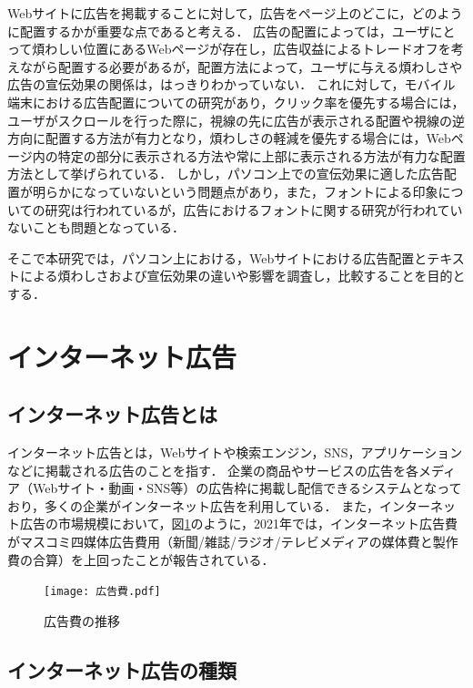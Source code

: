 \documentclass[12pt,a4j,titlepage]{ltjsarticle}
\begin{document}
Webサイトに広告を掲載することに対して，広告をページ上のどこに，どのように配置するかが重要な点であると考える．
広告の配置によっては，ユーザにとって煩わしい位置にあるWebページが存在し，広告収益によるトレードオフを考えながら配置する必要があるが，配置方法によって，ユーザに与える煩わしさや広告の宣伝効果の関係は，はっきりわかっていない．
これに対して，モバイル端末における広告配置についての研究があり，クリック率を優先する場合には，ユーザがスクロールを行った際に，視線の先に広告が表示される配置や視線の逆方向に配置する方法が有力となり，煩わしさの軽減を優先する場合には，Webページ内の特定の部分に表示される方法や常に上部に表示される方法が有力な配置方法として挙げられている\cite{mobile}．
しかし，パソコン上での宣伝効果に適した広告配置が明らかになっていないという問題点があり，また，フォントによる印象についての研究は行われているが，広告におけるフォントに関する研究が行われていないことも問題となっている．

そこで本研究では，パソコン上における，Webサイトにおける広告配置とテキストによる煩わしさおよび宣伝効果の違いや影響を調査し，比較することを目的とする．

\clearpage

\section{インターネット広告}
\subsection{インターネット広告とは}
インターネット広告とは，Webサイトや検索エンジン，SNS，アプリケーションなどに掲載される広告のことを指す．
企業の商品やサービスの広告を各メディア（Webサイト・動画・SNS等）の広告枠に掲載し配信できるシステムとなっており，多くの企業がインターネット広告を利用している．
また，インターネット広告の市場規模において，図\ref{fig:広告費}のように，2021年では，インターネット広告費がマスコミ四媒体広告費用（新聞/雑誌/ラジオ/テレビメディアの媒体費と製作費の合算）を上回ったことが報告されている\cite{dentsu}．

\begin{figure}[h]
\begin{center}
 \texttt{[image: 広告費.pdf]}
\end{center}
 \caption{広告費の推移}
 \label{fig:広告費}
\end{figure}

\subsection{インターネット広告の種類}
\end{document}
